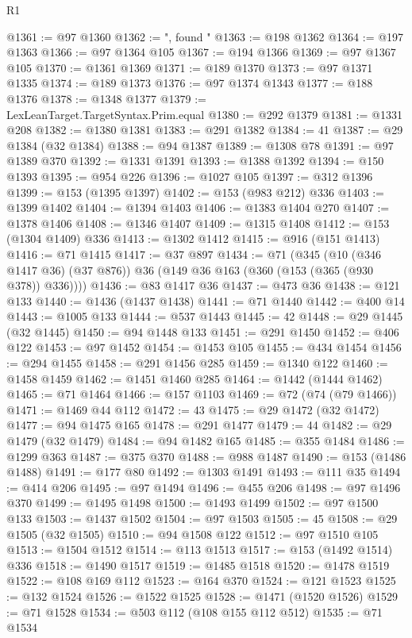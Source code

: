 \begin{lexlean}{R1}
\begin{coremodule}
@1361 := @97 @1360
@1362 := ", found "
@1363 := @198 @1362
@1364 := @197 @1363
@1366 := @97 @1364 @105
@1367 := @194 @1366
@1369 := @97 @1367 @105
@1370 := @1361 @1369
@1371 := @189 @1370
@1373 := @97 @1371 @1335
@1374 := @189 @1373
@1376 := @97 @1374 @1343
@1377 := @188 @1376
@1378 := @1348 @1377
@1379 := LexLeanTarget.TargetSyntax.Prim.equal
@1380 := @292 @1379
@1381 := @1331 @208
@1382 := @1380 @1381
@1383 := @291 @1382
@1384 := 41
@1387 := @29 @1384 (@32 @1384)
@1388 := @94 @1387
@1389 := @1308 @78
@1391 := @97 @1389 @370
@1392 := @1331 @1391
@1393 := @1388 @1392
@1394 := @150 @1393
@1395 := @954 @226
@1396 := @1027 @105
@1397 := @312 @1396
@1399 := @153 (@1395 @1397)
@1402 := @153 (@983 @212) @336
@1403 := @1399 @1402
@1404 := @1394 @1403
@1406 := @1383 @1404 @270
@1407 := @1378 @1406
@1408 := @1346 @1407
@1409 := @1315 @1408
@1412 := @153 (@1304 @1409) @336
@1413 := @1302 @1412
@1415 := @916 (@151 @1413)
@1416 := @71 @1415
@1417 := @37 @897
@1434 := @71
    (@345
      (@10 (@346 @1417 @36) (@37 @876))
      @36
      (@149 @36 @163 (@360 (@153 (@365 (@930 @378)) @336))))
@1436 := @83 @1417 @36
@1437 := @473 @36
@1438 := @121 @133
@1440 := @1436 (@1437 @1438)
@1441 := @71 @1440
@1442 := @400 @14
@1443 := @1005 @133
@1444 := @537 @1443
@1445 := 42
@1448 := @29 @1445 (@32 @1445)
@1450 := @94 @1448 @133
@1451 := @291 @1450
@1452 := @406 @122
@1453 := @97 @1452
@1454 := @1453 @105
@1455 := @434 @1454
@1456 := @294 @1455
@1458 := @291 @1456 @285
@1459 := @1340 @122
@1460 := @1458 @1459
@1462 := @1451 @1460 @285
@1464 := @1442 (@1444 @1462)
@1465 := @71 @1464
@1466 := @157 @1103
@1469 := @72 (@74 (@79 @1466))
@1471 := @1469 @44 @112
@1472 := 43
@1475 := @29 @1472 (@32 @1472)
@1477 := @94 @1475 @165
@1478 := @291 @1477
@1479 := 44
@1482 := @29 @1479 (@32 @1479)
@1484 := @94 @1482 @165
@1485 := @355 @1484
@1486 := @1299 @363
@1487 := @375 @370
@1488 := @988 @1487
@1490 := @153 (@1486 @1488)
@1491 := @177 @80
@1492 := @1303 @1491
@1493 := @111 @35
@1494 := @414 @206
@1495 := @97 @1494
@1496 := @455 @206
@1498 := @97 @1496 @370
@1499 := @1495 @1498
@1500 := @1493 @1499
@1502 := @97 @1500 @133
@1503 := @1437 @1502
@1504 := @97 @1503
@1505 := 45
@1508 := @29 @1505 (@32 @1505)
@1510 := @94 @1508 @122
@1512 := @97 @1510 @105
@1513 := @1504 @1512
@1514 := @113 @1513
@1517 := @153 (@1492 @1514) @336
@1518 := @1490 @1517
@1519 := @1485 @1518
@1520 := @1478 @1519
@1522 := @108 @169 @112
@1523 := @164 @370
@1524 := @121 @1523
@1525 := @132 @1524
@1526 := @1522 @1525
@1528 := @1471 (@1520 @1526)
@1529 := @71 @1528
@1534 := @503 @112 (@108 @155 @112 @512)
@1535 := @71 @1534

\end{coremodule}
\end{lexlean}
